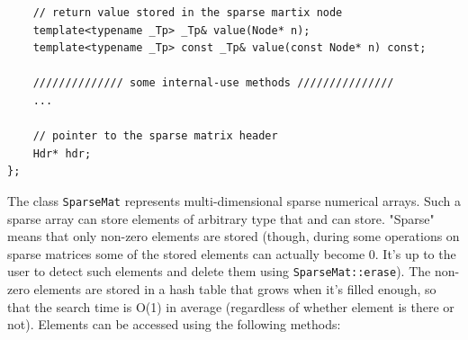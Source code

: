 \begin{lstlisting}
    // return value stored in the sparse martix node
    template<typename _Tp> _Tp& value(Node* n);
    template<typename _Tp> const _Tp& value(const Node* n) const;
    
    ////////////// some internal-use methods ///////////////
    ...

    // pointer to the sparse matrix header
    Hdr* hdr;
};
\end{lstlisting}

The class \texttt{SparseMat} represents multi-dimensional sparse numerical arrays. Such a sparse array can store elements of arbitrary type that  and  can store. "Sparse" means that only non-zero elements are stored (though, during some operations on sparse matrices some of the stored elements can actually become 0. It's up to the user to detect such elements and delete them using \texttt{SparseMat::erase}). The non-zero elements are stored in a hash table that grows when it's filled enough, so that the search time is O(1) in average (regardless of whether element is there or not). Elements can be accessed using the following methods:

